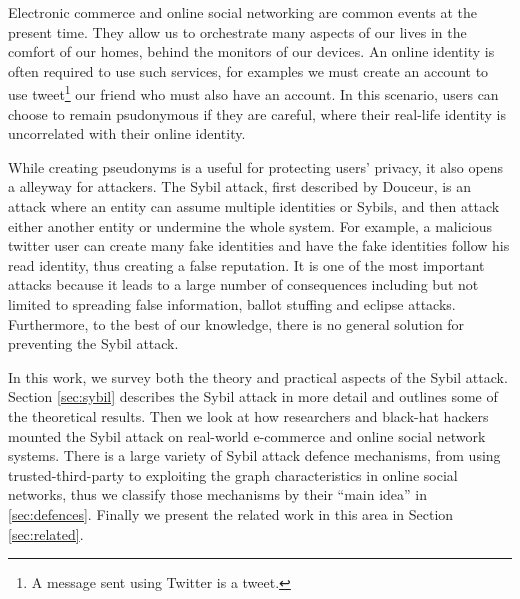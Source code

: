Electronic commerce and online social networking are common events at the
present time. They allow us to orchestrate many aspects of our lives in the
comfort of our homes, behind the monitors of our devices. An online identity is
often required to use such services, for examples we must create an account to
use tweet\footnote{A message sent using Twitter is a tweet.} our friend who must
also have an account. In this scenario, users can choose to remain psudonymous
if they are careful, where their real-life identity is uncorrelated with their
online identity. %

While creating pseudonyms is a useful for protecting users' privacy, it also
opens a alleyway for attackers. The Sybil attack, first described by
Douceur\cite{douceur2002sybil}, is an attack where an entity can assume multiple
identities or Sybils, and then attack either another entity or undermine the
whole system. For example, a malicious twitter user can create many fake
identities and have the fake identities follow his read identity, thus creating
a false reputation. It is one of the most important attacks because it leads to
a large number of consequences including but not limited to spreading false
information, ballot stuffing\cite{bhattacharjee2005avoiding} and eclipse
attacks\cite{singh2006eclipse}. Furthermore, to the best of our knowledge, there
is no general solution for preventing the Sybil attack.

In this work, we survey both the theory and practical aspects of the
Sybil attack. Section \ref{sec:sybil} describes the Sybil attack in more detail
and outlines some of the theoretical results. Then we look at how researchers
and black-hat hackers mounted the Sybil attack on real-world e-commerce and
online social network systems. There is a large variety of Sybil attack defence
mechanisms, from using trusted-third-party to exploiting the graph
characteristics in online social networks, thus we classify those mechanisms
by their ``main idea'' in \ref{sec:defences}. Finally we present the related
work in this area in Section \ref{sec:related}.

